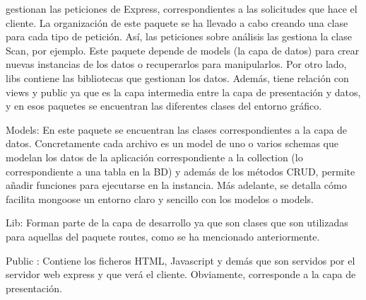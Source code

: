 \documentclass[twoside,twocolumn]{article}
\begin{document}
gestionan las peticiones de Express, correspondientes a las solicitudes que hace el
cliente. La organización de este paquete se ha llevado a cabo creando una clase para
cada tipo de petición. Así, las peticiones sobre análisis las gestiona la clase Scan,
por ejemplo. Este paquete depende de models (la capa de datos) para crear nuevas
instancias de los datos o recuperarlos para manipularlos. Por otro lado, libs contiene
las bibliotecas que gestionan los datos. Además, tiene relación con views y public ya
que es la capa intermedia entre la capa de presentación y datos, y en esos paquetes se
encuentran las diferentes clases del entorno gráfico.\\
\item Models:  En este paquete se encuentran las clases correspondientes a la capa de datos.
Concretamente cada archivo es un model de uno o varios schemas que modelan los
datos de la aplicación correspondiente a la collection (lo correspondiente a una tabla en
la BD) y además de los métodos CRUD, permite añadir funciones para ejecutarse
en la instancia. Más adelante, se detalla cómo facilita mongoose un entorno claro y
sencillo con los modelos o models.\\
\item Lib: Forman parte de la capa de desarrollo ya que son clases que son utilizadas para
aquellas del paquete routes, como se ha mencionado anteriormente.\\
\item Public : Contiene los ficheros HTML, Javascript y demás que son servidos por el servidor web express y que verá el cliente. Obviamente, corresponde a la capa de presentación.\\
\end{document}
